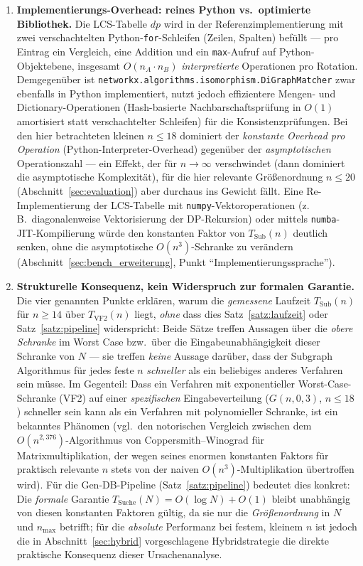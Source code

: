\documentclass[a4paper,12pt]{article}
\theoremstyle{definition}
\begin{document}
\begin{enumerate}
	\item \textbf{Implementierungs-Overhead: reines Python vs.\ optimierte Bibliothek.} Die LCS-Tabelle $dp$ wird in der Referenzimplementierung mit zwei verschachtelten Python-\texttt{for}-Schleifen (Zeilen, Spalten) befüllt — pro Eintrag ein Vergleich, eine Addition und ein \texttt{max}-Aufruf auf Python-Objektebene, insgesamt $O(n_A\cdot n_B)$ \emph{interpretierte} Operationen pro Rotation. Demgegenüber ist \texttt{networkx.algorithms.isomorphism.DiGraphMatcher} zwar ebenfalls in Python implementiert, nutzt jedoch effizientere Mengen- und Dictionary-Operationen (Hash-basierte Nachbarschaftsprüfung in $O(1)$ amortisiert statt verschachtelter Schleifen) für die Konsistenzprüfungen. Bei den hier betrachteten kleinen $n\le 18$ dominiert der \emph{konstante Overhead pro Operation} (Python-Interpreter-Overhead) gegenüber der \emph{asymptotischen} Operation\-szahl — ein Effekt, der für $n\to\infty$ verschwindet (dann dominiert die asymptotische Komplexität), für die hier relevante Größenordnung $n\le 20$ (Abschnitt~\ref{sec:evaluation}) aber durchaus ins Gewicht fällt. Eine Re-Implementierung der LCS-Tabelle mit \texttt{numpy}-Vektoroperationen (z.\,B.\ diagonalenweise Vektorisierung der DP-Rekursion) oder mittels \texttt{numba}-JIT-Kompilierung würde den konstanten Faktor von $T_{\text{Sub}}(n)$ deutlich senken, ohne die asymptotische $O(n^3)$-Schranke zu verändern (Abschnitt~\ref{sec:bench_erweiterung}, Punkt ``Implementierungssprache'').

	\item \textbf{Strukturelle Konsequenz, kein Widerspruch zur formalen Garantie.} Die vier genannten Punkte erklären, warum die \emph{gemessene} Laufzeit $T_{\text{Sub}}(n)$ für $n\ge 14$ über $T_{\text{VF2}}(n)$ liegt, \emph{ohne} dass dies Satz~\ref{satz:laufzeit} oder Satz~\ref{satz:pipeline} widerspricht: Beide Sätze treffen Aussagen über die \emph{obere Schranke} im Worst Case bzw.\ über die Eingabeunabhängigkeit dieser Schranke von $N$ — sie treffen \emph{keine} Aussage darüber, dass der Subgraph Algorithmus für jedes feste $n$ \emph{schneller} als ein beliebiges anderes Verfahren sein müsse. Im Gegenteil: Dass ein Verfahren mit exponentieller Worst-Case-Schranke (VF2) auf einer \emph{spezifischen} Eingabeverteilung ($G(n,0{,}3)$, $n\le 18$) schneller sein kann als ein Verfahren mit polynomieller Schranke, ist ein bekanntes Phänomen (vgl.\ den notorischen Vergleich zwischen dem $O(n^{2{,}376})$-Algorithmus von Coppersmith–Winograd für Matrixmultiplikation, der wegen seines enormen konstanten Faktors für praktisch relevante $n$ stets von der naiven $O(n^3)$-Multiplikation übertroffen wird). Für die Gen-DB-Pipeline (Satz~\ref{satz:pipeline}) bedeutet dies konkret: Die \emph{formale} Garantie $T_{\text{Suche}}(N)=O(\log N)+O(1)$ bleibt unabhängig von diesen konstanten Faktoren gültig, da sie nur die \emph{Größenordnung} in $N$ und $n_{\max}$ betrifft; für die \emph{absolute} Performanz bei festem, kleinem $n$ ist jedoch die in Abschnitt~\ref{sec:hybrid} vorgeschlagene Hybridstrategie die direkte praktische Konsequenz dieser Ursachenanalyse.
\end{enumerate}
\end{document}
